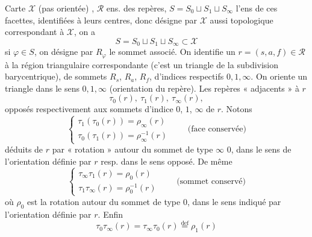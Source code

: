 \documentclass[11pt,a4paper]{article}
\begin{document}
Carte $\mathcal{X}$ (pas orientée) , $\mathcal{R}$ ens. des repères, $S = S_0 \sqcup S_1 \sqcup S_\infty$ 
l'ens de ces facettes, identifiées  à leurs centres, donc  désigne par $\mathcal{X}$ aussi \struck{\ill{}}  topologique correspondant à $\mathcal{X}$, on a
\[
  S = S_0 \sqcup S_1 \sqcup S_\infty \subset \mathcal{X}
\]
si $\varphi \in S$, on désigne par $R_\varphi$ le sommet associé. On identifie un $r = (s, a, f) \in \mathcal{R}$ à la région triangulaire correspondante (c'est un triangle de la subdivision barycentrique), de sommets $R_s$, $R_a$, $R_f$, d'indices respectifs $0, 1, \infty$. On oriente un triangle dans le sens $0, 1, \infty$ (orientation du repère). Les repères « adjacents » à $r$
\[
  \tau_0(r),\ \tau_1(r),\ \tau_\infty(r),
\]
opposés respectivement aux sommets d'indice $0$, $1$, $\infty$ de $r$. Notons
\begin{equation*}
  \tag{1}
  \begin{cases}
    \tau_1(\tau_0(r)) = \rho_\infty(r) \\
    \tau_0(\tau_1(r)) = \rho_\infty^{-1}(r)
  \end{cases}
  \qquad \text{(face conservée)}
\end{equation*}
déduits de $r$ par « rotation »  autour du sommet de type $\infty$  $0$, dans le sens  de l'orientation définie par $r$ resp. dans le sens opposé. De même
\begin{equation*}
  \tag{2}
  \begin{cases}
    \tau_\infty \tau_1(r) = \rho_0(r) \\
    \tau_1 \tau_\infty(r) = \rho_0^{-1}(r)
  \end{cases}
  \qquad \text{(sommet conservé)}
\end{equation*}
où $\rho_0$ est la rotation  autour du sommet de type $0$, dans le sens indiqué par l'orientation définie par $r$. Enfin
\begin{equation*}
  \tag{3}
  \tau_0 \tau_\infty(r) = \tau_\infty \tau_0(r) \overset{\text{def}}{=} \rho_1(r)
\end{equation*}

\end{document}
